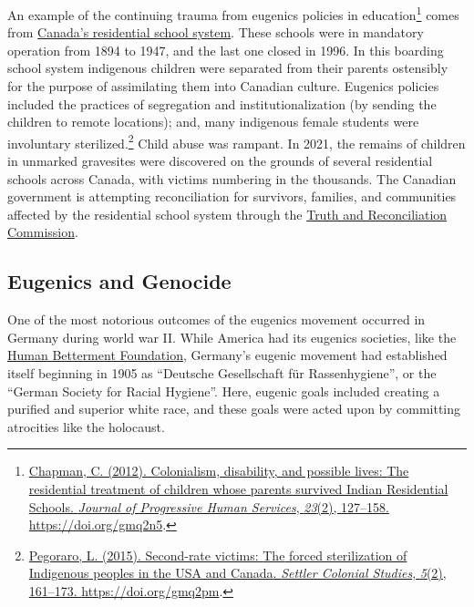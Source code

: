 \documentclass[
  oneside,
  12pt]{crumpbook}
\begin{document}
An example of the continuing trauma from eugenics policies in education\footnote{\protect\hyperlink{ref-chapmanColonialismDisabilityPossible2012}{Chapman, C. (2012). Colonialism, disability, and possible lives: {The} residential treatment of children whose parents survived {Indian Residential Schools}. \emph{Journal of Progressive Human Services}, \emph{23}(2), 127--158. \url{https://doi.org/gmq2n5}}.} comes from \href{https://en.wikipedia.org/wiki/Canadian_Indian_residential_school_system}{Canada's residential school system}. These schools were in mandatory operation from 1894 to 1947, and the last one closed in 1996. In this boarding school system indigenous children were separated from their parents ostensibly for the purpose of assimilating them into Canadian culture. Eugenics policies included the practices of segregation and institutionalization (by sending the children to remote locations); and, many indigenous female students were involuntary sterilized.\footnote{\protect\hyperlink{ref-pegoraroSecondrateVictimsForced2015}{Pegoraro, L. (2015). Second-rate victims: {The} forced sterilization of {Indigenous} peoples in the {USA} and {Canada}. \emph{Settler Colonial Studies}, \emph{5}(2), 161--173. \url{https://doi.org/gmq2pm}}.} Child abuse was rampant. In 2021, the remains of children in unmarked gravesites were discovered on the grounds of several residential schools across Canada, with victims numbering in the thousands. The Canadian government is attempting reconciliation for survivors, families, and communities affected by the residential school system through the \href{https://www.rcaanc-cirnac.gc.ca/eng/1450124405592/1529106060525}{Truth and Reconciliation Commission}.

\hypertarget{eugenics-and-genocide}{%
\subsection{Eugenics and Genocide}\label{eugenics-and-genocide}}

One of the most notorious outcomes of the eugenics movement occurred in Germany during world war II. While America had its eugenics societies, like the \href{https://en.wikipedia.org/wiki/Human_Betterment_Foundation}{Human Betterment Foundation}, Germany's eugenic movement had established itself beginning in 1905 as ``Deutsche Gesellschaft für Rassenhygiene'', or the ``German Society for Racial Hygiene''. Here, eugenic goals included creating a purified and superior white race, and these goals were acted upon by committing atrocities like the holocaust.
\end{document}
